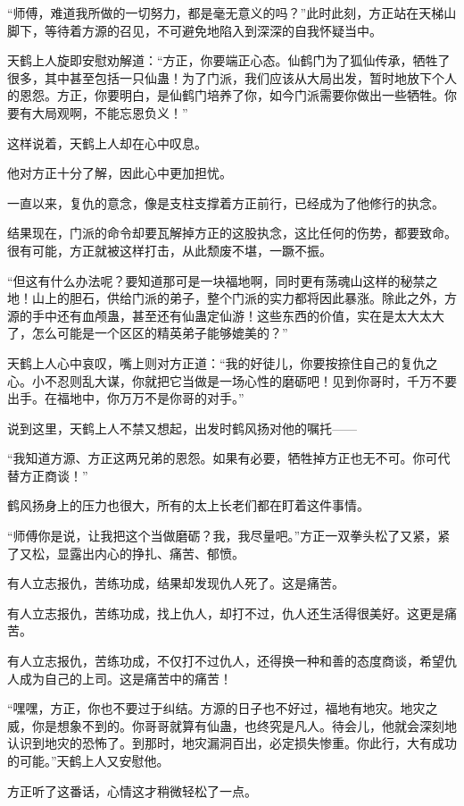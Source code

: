 \begin{this_body}
“师傅，难道我所做的一切努力，都是毫无意义的吗？”此时此刻，方正站在天梯山脚下，等待着方源的召见，不可避免地陷入到深深的自我怀疑当中。

天鹤上人旋即安慰劝解道：“方正，你要端正心态。仙鹤门为了狐仙传承，牺牲了很多，其中甚至包括一只仙蛊！为了门派，我们应该从大局出发，暂时地放下个人的恩怨。方正，你要明白，是仙鹤门培养了你，如今门派需要你做出一些牺牲。你要有大局观啊，不能忘恩负义！”

这样说着，天鹤上人却在心中叹息。

他对方正十分了解，因此心中更加担忧。

一直以来，复仇的意念，像是支柱支撑着方正前行，已经成为了他修行的执念。

结果现在，门派的命令却要瓦解掉方正的这股执念，这比任何的伤势，都要致命。很有可能，方正就被这样打击，从此颓废不堪，一蹶不振。

“但这有什么办法呢？要知道那可是一块福地啊，同时更有荡魂山这样的秘禁之地！山上的胆石，供给门派的弟子，整个门派的实力都将因此暴涨。除此之外，方源的手中还有血颅蛊，甚至还有仙蛊定仙游！这些东西的价值，实在是太大太大了，怎么可能是一个区区的精英弟子能够媲美的？”

天鹤上人心中哀叹，嘴上则对方正道：“我的好徒儿，你要按捺住自己的复仇之心。小不忍则乱大谋，你就把它当做是一场心性的磨砺吧！见到你哥时，千万不要出手。在福地中，你万万不是你哥的对手。”

说到这里，天鹤上人不禁又想起，出发时鹤风扬对他的嘱托——

“我知道方源、方正这两兄弟的恩怨。如果有必要，牺牲掉方正也无不可。你可代替方正商谈！”

鹤风扬身上的压力也很大，所有的太上长老们都在盯着这件事情。

“师傅你是说，让我把这个当做磨砺？我，我尽量吧。”方正一双拳头松了又紧，紧了又松，显露出内心的挣扎、痛苦、郁愤。

有人立志报仇，苦练功成，结果却发现仇人死了。这是痛苦。

有人立志报仇，苦练功成，找上仇人，却打不过，仇人还生活得很美好。这更是痛苦。

有人立志报仇，苦练功成，不仅打不过仇人，还得换一种和善的态度商谈，希望仇人成为自己的上司。这是痛苦中的痛苦！

“嘿嘿，方正，你也不要过于纠结。方源的日子也不好过，福地有地灾。地灾之威，你是想象不到的。你哥哥就算有仙蛊，也终究是凡人。待会儿，他就会深刻地认识到地灾的恐怖了。到那时，地灾漏洞百出，必定损失惨重。你此行，大有成功的可能。”天鹤上人又安慰他。

方正听了这番话，心情这才稍微轻松了一点。


\end{this_body}
